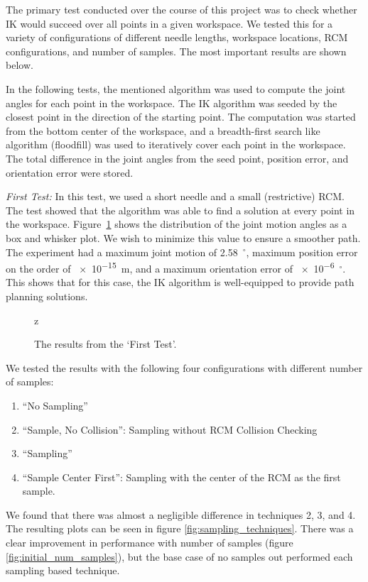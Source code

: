 \documentclass[BTech]{iitmdiss}
\newcommand{\degre}{\ensuremath{^\circ}}
\begin{document}
    The primary test conducted over the course of this project was to check whether IK would succeed over all points in a given workspace.
    We tested this for a variety of configurations of different needle lengths, workspace locations, RCM configurations, and number of samples.
    The most important results are shown below.

    In the following tests, the mentioned algorithm was used to compute the joint angles for each point in the workspace.
    The IK algorithm was seeded by the closest point in the direction of the starting point.
    The computation was started from the bottom center of the workspace, and a breadth-first search like algorithm (floodfill)
    was used to iteratively cover each point in the workspace.
    The total difference in the joint angles from the seed point, position error, and orientation error were stored.




    \emph{First Test:} In this test, we used a short needle and a small (restrictive) RCM\@.
    The test showed that the algorithm was able to find a solution at every point in the workspace.
    Figure~\ref{fig:initial_test} shows the distribution of the joint motion angles as a box and whisker plot.
    We wish to minimize this value to ensure a smoother path.
    The experiment had a maximum joint motion of \SI{2.58}{\degre}, maximum position error on the order of \SI{e-15}{\meter},
    and a maximum orientation error of \SI{e-6}{\degre}.
    This shows that for this case, the IK algorithm is well-equipped to provide path planning solutions.

    \begin{figure}

        \centering
        \qquad
        \centering
        \caption{The results from the `First Test'.}
        \label{fig:initial_test}z
    \end{figure}

    We tested the results with the following four configurations with different number of samples:
    \begin{enumerate}
        \item ``No Sampling''
        \item ``Sample, No Collision'': Sampling without RCM Collision Checking
        \item ``Sampling''
        \item ``Sample Center First'': Sampling with the center of the RCM as the first sample.
    \end{enumerate}
    We found that there was almost a negligible difference in techniques 2, 3, and 4.
    The resulting plots can be seen in figure \ref{fig:sampling_techniques}.
    There was a clear improvement in performance with number of samples (figure \ref{fig:initial_num_samples}),
    but the base case of no samples out performed each sampling based technique.
\end{document}
